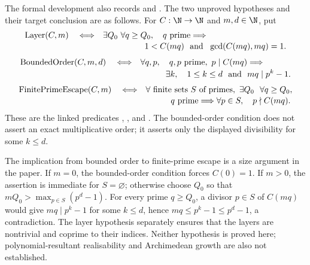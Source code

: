 The formal development also records
and
.
The two unproved hypotheses and their target conclusion are as follows.  For
$C:\N\to\N$ and $m,d\in\N$, put
\[
\begin{aligned}
\operatorname{Layer}(C,m)\quad\Longleftrightarrow\quad&
\exists Q_0\ \forall q\ge Q_0,\quad q\ {\rm prime}\Longrightarrow\\[-2pt]
&\hspace{5em}1<C(mq)\ \hbox{ and }\ \gcd(C(mq),mq)=1.
\end{aligned}
\]
\[
\begin{aligned}
\operatorname{BoundedOrder}(C,m,d)\quad\Longleftrightarrow\quad&
\forall q,p,\quad q,p\ {\rm prime},\ p\mid C(mq)\Longrightarrow\\[-2pt]
&\hspace{3em}\exists k,\quad 1\le k\le d\ \hbox{ and }\ mq\mid p^k-1.
\end{aligned}
\]
\[
\begin{aligned}
\operatorname{FinitePrimeEscape}(C,m)\quad\Longleftrightarrow\quad&
\forall\text{ finite sets }S\text{ of primes},\ \exists Q_0\
\ \forall q\ge Q_0,\\[-2pt]
&\hspace{3em}q\ {\rm prime}\Longrightarrow
\forall p\in S,\quad p\nmid C(mq).
\end{aligned}
\]
These are the linked predicates
,
,
and
.
The bounded-order condition does not assert an exact multiplicative order; it
asserts only the displayed divisibility for some $k\le d$.

The implication from bounded order to finite-prime escape is a size argument
in the paper.  If $m=0$, the bounded-order condition forces $C(0)=1$.  If
$m>0$, the assertion is immediate for $S=\varnothing$; otherwise choose
$Q_0$ so that $mQ_0>\max_{p\in S}(p^d-1)$.  For every prime
$q\ge Q_0$, a divisor $p\in S$ of $C(mq)$ would give
$mq\mid p^k-1$ for some $k\le d$, hence
$mq\le p^k-1\le p^d-1$, a contradiction.  The layer hypothesis separately
ensures that the layers are nontrivial and coprime to their indices.  Neither
hypothesis is proved here; polynomial-resultant realisability and
Archimedean growth are also not established.



